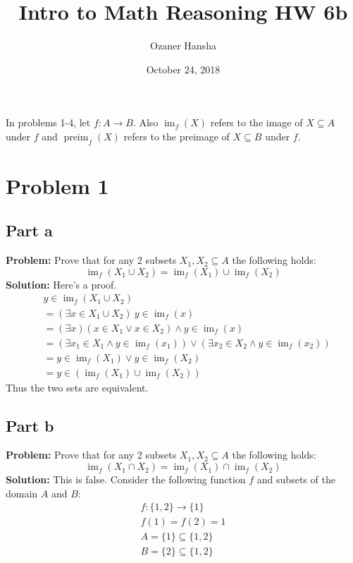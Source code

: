 \documentclass{article}
\begin{document}
\title{Intro to Math Reasoning HW 6b}
\author{Ozaner Hansha}
\date{October 24, 2018}
\maketitle

In problems 1-4, let $f:A\to B$. Also $\operatorname{im}_f(X)$ refers to the image of $X\subseteq A$ under $f$ and $\operatorname{preim}_f(X)$ refers to the preimage of $X\subseteq B$ under $f$.



\section*{Problem 1}
\subsection*{Part a}
\textbf{Problem:} Prove that for any 2 subsets $X_1,X_2\subseteq A$ the following holds:
$$\operatorname{im}_f(X_1\cup X_2)=\operatorname{im}_f(X_1)\cup\operatorname{im}_f(X_2)$$
\textbf{Solution:} Here's a proof.
\begin{align*}
  &y\in\operatorname{im}_f(X_1\cup X_2)\\
  &=(\exists x\in X_1\cup X_2)\ y\in\operatorname{im}_f(x)\tag{def. of image of a set}\\
  &=(\exists x)(x\in X_1\vee x\in X_2)\wedge y\in\operatorname{im}_f(x)\tag{def. of set union}\\
  &=(\exists x_1\in X_1\wedge y\in\operatorname{im}_f(x_1))\vee (\exists x_2\in X_2\wedge y\in\operatorname{im}_f(x_2)) \tag{distr. $\wedge$}\\
  &=y\in\operatorname{im}_f(X_1)\vee y\in\operatorname{im}_f(X_2)\tag{def. of image of a set}\\
  &=y\in(\operatorname{im}_f(X_1)\cup\operatorname{im}_f(X_2))\tag{def. of set union}
\end{align*}
Thus the two sets are equivalent.

\subsection*{Part b}
\textbf{Problem:} Prove that for any 2 subsets $X_1,X_2\subseteq A$ the following holds:
$$\operatorname{im}_f(X_1\cap X_2)=\operatorname{im}_f(X_1)\cap\operatorname{im}_f(X_2)$$
\textbf{Solution:} This is false. Consider the following function $f$ and subsets of the domain $A$ and $B$:
\begin{gather*}
  f:\{1,2\}\to\{1\}\\
  f(1)=f(2)=1\\
  A=\{1\}\subseteq\{1,2\}\\
  B=\{2\}\subseteq\{1,2\}\\
\end{gather*}
\end{document}
